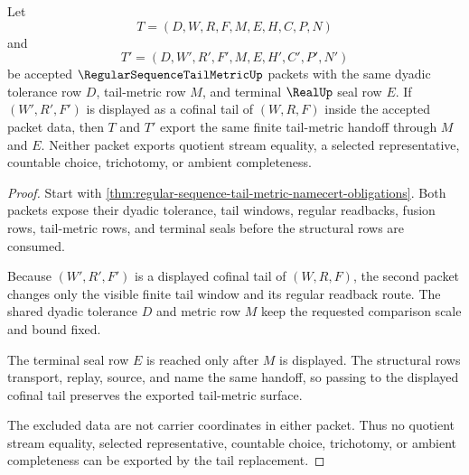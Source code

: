 \begin{theorem}\label{thm:regular-sequence-tail-metric-tail-stability}
Let
$$
T=(D,W,R,F,M,E,H,C,P,N)
$$
and
$$
T'=(D,W',R',F',M,E,H',C',P',N')
$$
be accepted $\RegularSequenceTailMetricUp$ packets with the same dyadic tolerance row $D$, tail-metric row $M$, and terminal $\RealUp$ seal row $E$. If $(W',R',F')$ is displayed as a cofinal tail of $(W,R,F)$ inside the accepted packet data, then $T$ and $T'$ export the same finite tail-metric handoff through $M$ and $E$. Neither packet exports quotient stream equality, a selected representative, countable choice, trichotomy, or ambient completeness.
\end{theorem}
\begin{proof}
Start with \autoref{thm:regular-sequence-tail-metric-namecert-obligations}. Both packets expose their dyadic tolerance, tail windows, regular readbacks, fusion rows, tail-metric rows, and terminal seals before the structural rows are consumed.

Because $(W',R',F')$ is a displayed cofinal tail of $(W,R,F)$, the second packet changes only the visible finite tail window and its regular readback route. The shared dyadic tolerance $D$ and metric row $M$ keep the requested comparison scale and bound fixed.

The terminal seal row $E$ is reached only after $M$ is displayed. The structural rows transport, replay, source, and name the same handoff, so passing to the displayed cofinal tail preserves the exported tail-metric surface.

The excluded data are not carrier coordinates in either packet. Thus no quotient stream equality, selected representative, countable choice, trichotomy, or ambient completeness can be exported by the tail replacement.
\end{proof}

